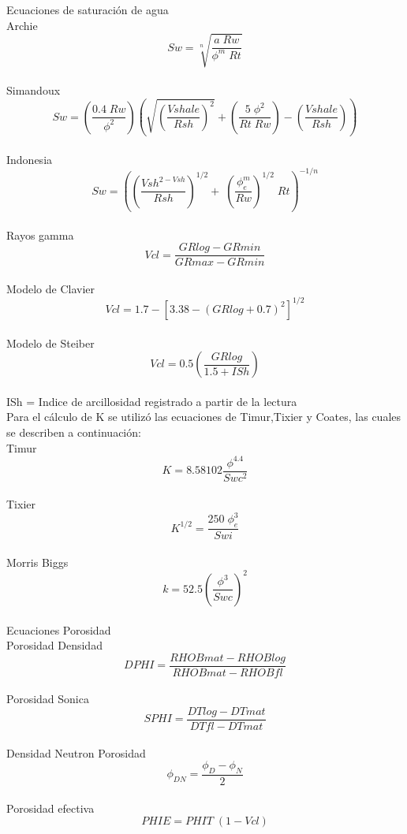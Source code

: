 \documentclass[10pt,a4paper]{report}
\begin{document}
\newpage
Ecuaciones de saturación de agua
\\ Archie
\\ $$\displaystyle Sw=\sqrt[n]{\dfrac{a \; Rw}{\phi^m \; Rt}}$$
\\ Simandoux
\\ $$\displaystyle Sw=\left(\dfrac{0.4 \; Rw}{\phi^2}\right)\left(\sqrt{\left(\dfrac{Vshale}{Rsh}\right)^2} + \left(\dfrac{5 \; \phi^2}{Rt \; Rw}\right)-\left(\dfrac{Vshale}{Rsh}\right)\right)$$
\\ Indonesia
\\ $$\displaystyle Sw=\left(\left(\dfrac{Vsh^{2-Vsh}}{Rsh}\right)^{1/2}+\; \left(\dfrac{\phi_e^m}{Rw}\right)^{1/2} \; Rt\right)^{-1/n}$$
\\ Rayos gamma
\\ $$\displaystyle Vcl=\dfrac{GRlog-GRmin}{GRmax-GRmin}$$ 
\\ Modelo de Clavier
\\ $$\displaystyle Vcl=1.7-\left[3.38-(GRlog+0.7)^2\right]^{1/2}$$
\\ Modelo de Steiber $$\displaystyle Vcl=0.5\left(\dfrac{GRlog}{1.5 + ISh}\right)$$
\\ ISh = Indice de arcillosidad registrado a partir de la lectura
\\ Para el cálculo de K se utilizó las ecuaciones de Timur,Tixier y Coates, las cuales se describen a continuación:
\\ Timur
\\ $$K=8.58102 \dfrac{\phi^{4.4}}{Swc^2}$$
\\ Tixier
\\ $$K^{1/2}= \dfrac{250 \; \phi_e^3}{Swi}$$
\\ Morris Biggs
\\ $$k = 52.5 \left(\dfrac{\phi^3}{Swc}\right)^2$$
\\ Ecuaciones Porosidad
\\ Porosidad Densidad
\\ $$DPHI = \dfrac{RHOBmat-RHOBlog}{RHOBmat-RHOBfl}$$
\\Porosidad Sonica
\\ $$SPHI = \dfrac{DTlog-DTmat}{DTfl-DTmat}$$
\\ Densidad Neutron Porosidad
\\ $$\phi_{DN}=\dfrac{\phi_D-\phi_N}{2}$$
\\ Porosidad efectiva
\\ $$PHIE = PHIT \; (1-Vcl)$$
\end{document}
